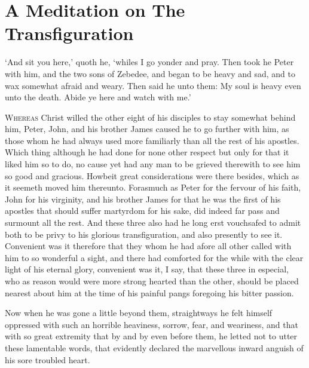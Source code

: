\documentclass[a5paper]{scrbook}
\begin{document}
	\chapter{A Meditation on The Transfiguration}
	
	\begin{scripture}[Mt 26:36-38, Mk 14:32-34]
		‘And sit you here,’ quoth he, ‘whiles I go yonder and pray. Then took he Peter with him, and the two sons of Zebedee, and began to be heavy and sad, and to wax somewhat afraid and weary. Then said he unto them: My soul is heavy even unto the death. Abide ye here and watch with me.’
	\end{scripture}
	
	\vspace{10mm}
	
	\lettrine{W}{hereas} Christ willed the other eight of his disciples to stay somewhat behind him, Peter, John, and his brother James caused he to go further with him, as those whom he had always used more familiarly than all the rest of his apostles. Which thing although he had done for none other respect but only for that it liked him so to do, no cause yet had any man to be grieved therewith to see him so good and gracious. Howbeit great considerations were there besides, which as it seemeth moved him thereunto. Forasmuch as Peter for the fervour of his faith, John for his virginity, and his brother James for that he was the first of his apostles that should suffer martyrdom for his sake, did indeed far pass and surmount all the rest. And these three also had he long erst vouchsafed to admit both to be privy to his glorious transfiguration, and also presently to see it. Convenient was it therefore that they whom he had afore all other called with him to so wonderful a sight, and there had comforted for the while with the clear light of his eternal glory, convenient was it, I say, that these three in especial, who as reason would were more strong hearted than the other, should be placed nearest about him at the time of his painful pangs foregoing his bitter passion.
	
	Now when he was gone a little beyond them, straightways he felt himself oppressed with such an horrible heaviness, sorrow, fear, and weariness, and that with so great extremity that by and by even before them, he letted not to utter these lamentable words, that evidently declared the marvellous inward anguish of his sore troubled heart.
	
	
	
\end{document}
